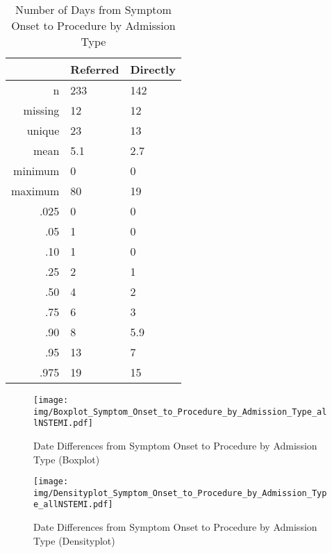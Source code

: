 \documentclass[presentation,xcolor=pdftex,dvipsnames,table,11pt]{beamer}
\begin{document}
\begin{tiny}
\begin{frame}
\begin{table}[ht]
\centering
\begin{tabular}{rll}
  \toprule
 & Referred & Directly \\ 
  \midrule
n & 233 & 142 \\ 
  missing & 12 & 12 \\ 
  unique & 23 & 13 \\ 
  mean & 5.1 & 2.7 \\ 
  minimum & 0 & 0 \\ 
  maximum & 80 & 19 \\ 
  .025 & 0 & 0 \\ 
  .05 & 1 & 0 \\ 
  .10 & 1 & 0 \\ 
  .25 & 2 & 1 \\ 
  .50 & 4 & 2 \\ 
  .75 & 6 & 3 \\ 
  .90 & 8 & 5.9 \\ 
  .95 & 13 & 7 \\ 
  .975 & 19 & 15 \\ 
   \bottomrule
\end{tabular}
\caption{Number of Days from Symptom Onset to Procedure by Admission Type} 
\end{table}\end{frame}


\begin{frame}
\begin{figure}
  \centering
  \caption{Date Differences from Symptom Onset to Procedure by Admission Type (Boxplot)}
  \label{Boxplot: Date Differences from Symptom Onset to Procedure by Admission Type}
\texttt{[image: img/Boxplot\_Symptom\_Onset\_to\_Procedure\_by\_Admission\_Type\_allNSTEMI.pdf]}\end{figure}
\end{frame}



\begin{frame}
\begin{figure}
  \centering
  \caption{Date Differences from Symptom Onset to Procedure by Admission Type (Densityplot)}
  \label{Density: Date Differences from Symptom Onset to Procedure by Admission Type}
\texttt{[image: img/Densityplot\_Symptom\_Onset\_to\_Procedure\_by\_Admission\_Type\_allNSTEMI.pdf]}\end{figure}
\end{frame}


\end{tiny}
\end{document}
